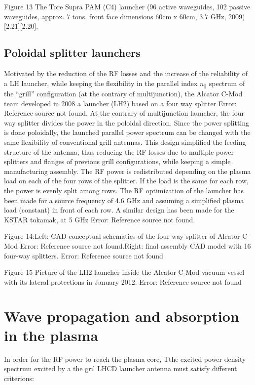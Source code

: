 Figure 13 The Tore Supra PAM (C4) launcher (96 active waveguides, 102 passive waveguides, approx. 7 tons, front face dimensions 60cm x 60cm, 3.7 GHz, 2009) [2.21][2.20].

\subsection{Poloidal splitter launchers}
Motivated by the reduction of the RF losses and the increase of the reliability of a LH launcher, while keeping the flexibility in the parallel index $n_{\parallel}$ spectrum of the “grill” configuration (at the contrary of multijunction), the Alcator C-Mod team developed in 2008 a launcher (LH2) based on a four way splitter Error: Reference source not found. At the contrary of multijunction launcher, the four way splitter divides the power in the poloidal direction. Since the power splitting is done poloidally, the launched parallel power spectrum can be changed with the same flexibility of conventional grill antennas. This design simplified the feeding structure of the antenna, thus reducing the RF losses due to multiple power splitters and flanges of previous grill configurations, while keeping a simple manufacturing assembly. The RF power is redistributed depending on the plasma load on each of the four rows of the splitter. If the load is the same for each row, the power is evenly split among rows. The RF optimization of the launcher has been made for a source frequency of 4.6 GHz and assuming a simplified plasma load (constant) in front of each row. A similar design has been made for the KSTAR tokamak, at 5 GHz Error: Reference source not found. 

Figure 14:Left: CAD conceptual schematics of the four-way splitter of Alcator C-Mod Error: Reference source not found.Right: final assembly CAD model with 16 four-way splitters. Error: Reference source not found

Figure 15 Picture of the LH2 launcher inside the Alcator C-Mod vacuum vessel with its lateral protections in January 2012. Error: Reference source not found

\section{Wave propagation and absorption in the plasma}
In order for the RF power to reach the plasma core, Tthe excited power density spectrum excited by a the gril LHCD launcher antenna must satisfy different criterions: 

